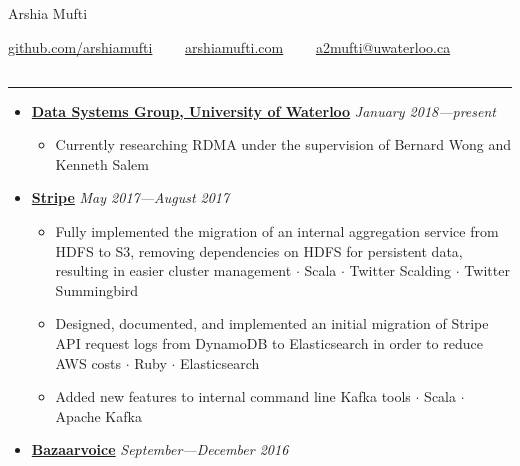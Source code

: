 \documentclass[5pt,letterpaper]{article}
\newcommand{\dt}{$\cdot$ }
\begin{document}
\begin{center}
  {\huge Arshia Mufti}


  \href{https://github.com/arshiamufti/}{github.com/arshiamufti}\ \ \textbullet
  \ \ \href{http://arshiamufti.com}{arshiamufti.com}\ \ \textbullet
  \ \ \href{mailto:a2mufti@uwaterloo.ca}{a2mufti@uwaterloo.ca}

\end{center}
\vspace{-2.0em}
\subsection*{}
\hrule
\vspace{1.0em}
\begin{itemize}[leftmargin=1em, noitemsep]
  \item[]
    {\href{http://dsg.uwaterloo.ca}{\textbf{Data Systems Group, University of
      Waterloo}} \hfill
    \emph{January 2018---present}}
    \begin{itemize}[label=\textbullet, noitemsep, nosep]
      \item Currently researching RDMA under the supervision of Bernard Wong and
        Kenneth Salem
    \end{itemize}

  \item[]
    {\href{https://stripe.com}{\textbf{Stripe}} \hfill
    \emph{May 2017---August 2017}}

    \begin{itemize}[label=\textbullet, noitemsep, nosep]
      \item Fully implemented the migration of an internal aggregation service
        from HDFS to S3, removing dependencies on HDFS for persistent data, resulting in easier cluster
        management \dt Scala \dt Twitter Scalding \dt Twitter Summingbird
      \item Designed, documented, and implemented an initial migration of Stripe
        API request logs from DynamoDB to Elasticsearch in order to reduce AWS
        costs \dt Ruby \dt Elasticsearch
      \item Added new features to internal command line Kafka tools \dt Scala \dt Apache Kafka
    \end{itemize}

  \item[]
    {\href{http://www.bazaarvoice.com}{\textbf{Bazaarvoice}} \hfill
    \emph{September---December 2016}}


\end{itemize}
\end{document}
